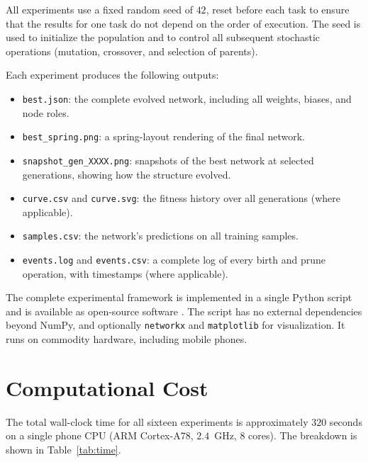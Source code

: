 All experiments use a fixed random seed of $42$, reset before each
task to ensure that the results for one task do not depend on the
order of execution. The seed is used to initialize the population and
to control all subsequent stochastic operations (mutation, crossover,
and selection of parents).

Each experiment produces the following outputs:

\begin{itemize}
  \item \texttt{best.json}: the complete evolved network, including
    all weights, biases, and node roles.
  \item \texttt{best\_spring.png}: a spring-layout rendering of the
    final network.
  \item \texttt{snapshot\_gen\_XXXX.png}: snapshots of the best
    network at selected generations, showing how the structure
    evolved.
  \item \texttt{curve.csv} and \texttt{curve.svg}: the fitness history
    over all generations (where applicable).
  \item \texttt{samples.csv}: the network's predictions on all
    training samples.
  \item \texttt{events.log} and \texttt{events.csv}: a complete log
    of every birth and prune operation, with timestamps (where
    applicable).
\end{itemize}

The complete experimental framework is implemented in a single Python
script and is available as open-source software
\citep{modnet2026code}. The script has no external dependencies beyond
NumPy, and optionally \texttt{networkx} and \texttt{matplotlib} for
visualization. It runs on commodity hardware, including mobile phones.

\section{Computational Cost}
\label{sec:exp-cost}

The total wall-clock time for all sixteen experiments is
approximately $320$ seconds on a single phone CPU (ARM Cortex-A78,
$2.4$~GHz, $8$ cores). The breakdown is shown in
Table~\ref{tab:time}.

